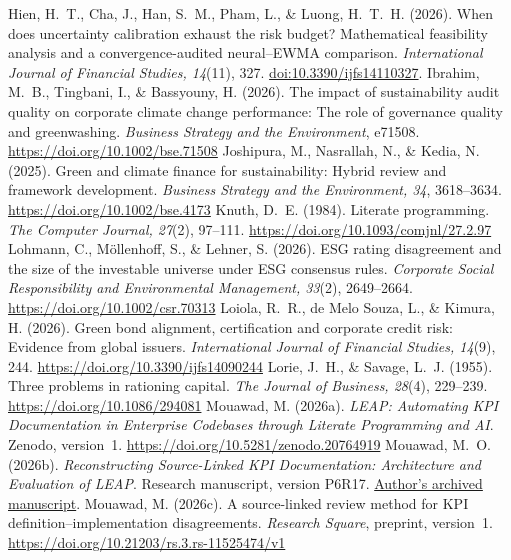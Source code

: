 \begin{thebibliography}{}
 Hien, H.~T., Cha, J., Han, S.~M., Pham, L., \& Luong, H.~T.~H. (2026). When does uncertainty calibration exhaust the risk budget? Mathematical feasibility analysis and a convergence-audited neural--EWMA comparison. \emph{International Journal of Financial Studies, 14}(11), 327. \href{https://www.mdpi.com/2227-7072/14/11/327}{doi:10.3390/ijfs14110327}.
 Ibrahim, M.~B., Tingbani, I., \& Bassyouny, H. (2026). The impact of sustainability audit quality on corporate climate change performance: The role of governance quality and greenwashing. \emph{Business Strategy and the Environment}, e71508. \url{https://doi.org/10.1002/bse.71508}
 Joshipura, M., Nasrallah, N., \& Kedia, N. (2025). Green and climate finance for sustainability: Hybrid review and framework development. \emph{Business Strategy and the Environment, 34}, 3618--3634. \url{https://doi.org/10.1002/bse.4173}
 Knuth, D.~E. (1984). Literate programming. \emph{The Computer Journal, 27}(2), 97--111. \url{https://doi.org/10.1093/comjnl/27.2.97}
 Lohmann, C., Möllenhoff, S., \& Lehner, S. (2026). ESG rating disagreement and the size of the investable universe under ESG consensus rules. \emph{Corporate Social Responsibility and Environmental Management, 33}(2), 2649--2664. \url{https://doi.org/10.1002/csr.70313}
 Loiola, R.~R., de Melo Souza, L., \& Kimura, H. (2026). Green bond alignment, certification and corporate credit risk: Evidence from global issuers. \emph{International Journal of Financial Studies, 14}(9), 244. \url{https://doi.org/10.3390/ijfs14090244}
 Lorie, J.~H., \& Savage, L.~J. (1955). Three problems in rationing capital. \emph{The Journal of Business, 28}(4), 229--239. \url{https://doi.org/10.1086/294081}
 Mouawad, M. (2026a). \emph{LEAP: Automating KPI Documentation in Enterprise Codebases through Literate Programming and AI}. Zenodo, version~1. \url{https://doi.org/10.5281/zenodo.20764919}
 Mouawad, M.~O. (2026b). \emph{Reconstructing Source-Linked KPI Documentation: Architecture and Evaluation of LEAP}. Research manuscript, version P6R17. \href{https://github.com/Meshaal-Mouawad/LEAP-Paper1-Evidence/blob/a20b243683a262fd43987013117120c313ec8fa8/SCP_P6R17/01_Manuscript_SCP_P6R17.pdf}{Author's archived manuscript}.
 Mouawad, M. (2026c). A source-linked review method for KPI definition--implementation disagreements. \emph{Research Square}, preprint, version~1. \url{https://doi.org/10.21203/rs.3.rs-11525474/v1}

\end{thebibliography}
